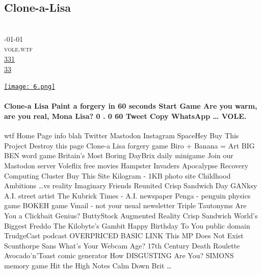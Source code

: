 \documentclass[10pt,a4paper]{article}
\begin{document}
\subsection{Clone-a-Lisa}
\noindent\begin{minipage}[t]{0.19\linewidth}
\vspace{0pt}
\noindent\scshape\footnotesize
\\ {\scriptsize\faCalendar}-01-01
\\ {\scriptsize\faGlobe}\space 
vole.wtf
\\ {\scriptsize\faThumbsOUp}\space 
\href{http://news.ycombinator.com/item?id=37192710\&utm\_term=comment}{331} 
\\ {\scriptsize\faComments}\space 
\href{http://news.ycombinator.com/item?id=37192710\&utm\_term=comment}{33} 
\end{minipage} 
\begin{minipage}[t]{0.80\linewidth}
\vspace{0pt}
\begin{multicols}{2}
    \href{https://vole.wtf/clone-a-lisa/?utm\_source=hackernewsletter\&utm\_medium=email\&utm\_term=fav}{
        \texttt{[image: 6.png]}
    }
\paragraph{Clone-a Lisa
Paint a forgery in 60 seconds
Start Game
Are you warm, are you real, Mona Lisa?
0
.
0
60
Tweet
Copy
WhatsApp
…
VOLE.}
wtf
Home Page
info blah
Twitter
Mastodon
Instagram
SpaceHey
Buy This Project
Destroy this page
Clone-a Lisa forgery game
Biro + Banana = Art
BIG BEN word game
Britain’s Most Boring
DayBrix daily minigame
Join our Mastodon server
Voleflix free movies
Hampster Invaders
Apocalypse Recovery Computing Cluster
Buy This Site
Kilogram - 1KB photo site
Childhood Ambitions …vs reality
Imaginary Friends Reunited
Crisp Sandwich Day
GANksy A.I. street artist
The Kubrick Times - A.I. newspaper
Penga - penguin physics game
BOKEH game
Vmail - not your usual newsletter
Triple Tautonyms
Are You a Clickbait Genius?
ButtyStock
Augmented Reality Crisp Sandwich
World’s Biggest Freddo
The Kilobyte’s Gambit
Happy Birthday To You public domain
TrudgeCast podcast
OVERPRICED BASIC LINK
This MP Does Not Exist
Scunthorpe Sans
What’s Your Webcam Age?
17th Century Death Roulette
Avocado’n’Toast comic generator
How DISGUSTING Are You?
SIMONS memory game
Hit the High Notes
Calm Down Brit
\dots
\end{multicols}
\end{minipage}
\par\medskip
\end{document}
